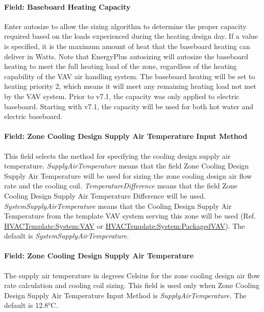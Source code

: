 \paragraph{Field: Baseboard Heating Capacity}\label{field-baseboard-heating-capacity-8}

Enter autosize to allow the sizing algorithm to determine the proper capacity required based on the loads experienced during the heating design day. If a value is specified, it is the maximum amount of heat that the baseboard heating can deliver in Watts. Note that EnergyPlus autosizing will autosize the baseboard heating to meet the full heating load of the zone, regardless of the heating capability of the VAV air handling system. The baseboard heating will be set to heating priority 2, which means it will meet any remaining heating load not met by the VAV system. Prior to v7.1, the capacity was only applied to electric baseboard. Starting with v7.1, the capacity will be used for both hot water and electric baseboard.

\paragraph{Field: Zone Cooling Design Supply Air Temperature Input Method}\label{field-zone-cooling-design-supply-air-temperature-input-method-7}

This field selects the method for specifying the cooling design supply air temperature. \emph{SupplyAirTemperature} means that the field Zone Cooling Design Supply Air Temperature will be used for sizing the zone cooling design air flow rate and the cooling coil. \emph{TemperatureDifference} means that the field Zone Cooling Design Supply Air Temperature Difference will be used. \emph{SystemSupplyAirTemperature} means that the Cooling Design Supply Air Temperature from the template VAV system serving this zone will be used (Ref. \hyperref[hvactemplatesystemvav]{HVACTemplate:System:VAV} or \hyperref[hvactemplatesystempackagedvav]{HVACTemplate:System:PackagedVAV}). The default is \emph{SystemSupplyAirTemperature.}

\paragraph{Field: Zone Cooling Design Supply Air Temperature}\label{field-zone-cooling-design-supply-air-temperature-6}

The supply air temperature in degrees Celsius for the zone cooling design air flow rate calculation and cooling coil sizing. This field is used only when Zone Cooling Design Supply Air Temperature Input Method is \emph{SupplyAirTemperature.} The default is 12.8°C.

